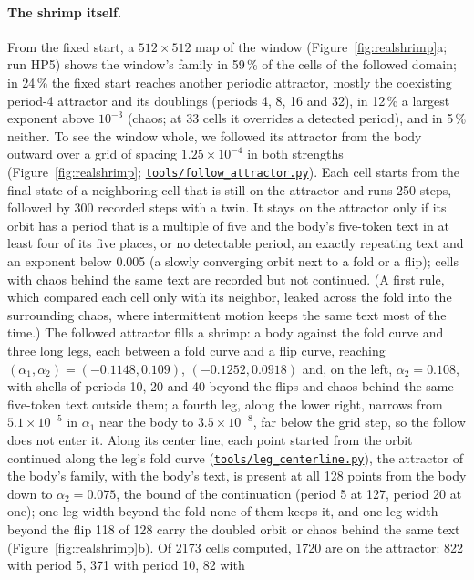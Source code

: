 \documentclass[11pt,letterpaper]{article}
\newcommand{\repourl}{https://github.com/tdj28/neural-shrimp}
\newcommand{\reporef}{arxiv-v1}
\newcommand{\repo}[1]{\href{\repourl/blob/\reporef/#1}{\nolinkurl{#1}}}
\begin{document}
\paragraph{The shrimp itself.} From the fixed start, a $512\times512$ map of the window (Figure~\ref{fig:realshrimp}a;
run HP5) shows the window's family in 59\,\% of the cells of the followed domain; in 24\,\% the fixed start reaches
another periodic attractor, mostly the coexisting period-4 attractor and its doublings (periods 4, 8, 16 and 32), in
12\,\% a largest exponent above $10^{-3}$ (chaos; at 33 cells it overrides a detected period), and in 5\,\% neither. To see the window whole, we followed its attractor from the body outward over a grid of
spacing $1.25\times10^{-4}$ in both strengths (Figure~\ref{fig:realshrimp}; \repo{tools/follow_attractor.py}). Each
cell starts from the final state of a neighboring cell that is still on the attractor and runs 250 steps, followed by
300 recorded steps with a twin. It stays on the attractor only if its orbit has a period that is a multiple of five and
the body's five-token text in at least four of its five places, or no detectable period, an exactly repeating text and
an exponent below 0.005 (a slowly converging orbit next to a fold or a flip); cells with chaos behind the same text are
recorded but not continued. (A first rule, which compared each cell only with its neighbor, leaked across the fold
into the surrounding chaos, where intermittent motion keeps the same text most of the time.) The followed attractor
fills a shrimp: a body against the fold curve and three long legs, each between a fold curve and a flip curve, reaching
$(\alpha_1,\alpha_2)=(-0.1148,0.109)$, $(-0.1252,0.0918)$ and, on the left, $\alpha_2=0.108$, with shells of periods
10, 20 and 40 beyond the flips and chaos behind the same five-token text outside them; a fourth leg, along the lower right, narrows from $5.1\times10^{-5}$ in $\alpha_1$ near the body to
$3.5\times10^{-8}$, far below the grid step, so the follow does not enter it. Along its center line, each point
started from the orbit continued along the leg's fold curve (\repo{tools/leg_centerline.py}), the attractor of
the body's family, with the body's text, is present at all 128 points from the body down to $\alpha_2=0.075$, the
bound of the continuation (period 5 at 127, period 20 at one); one leg width beyond the fold none of them keeps it,
and one leg width beyond the flip 118 of 128 carry the doubled orbit or chaos behind the same text
(Figure~\ref{fig:realshrimp}b). Of 2173 cells computed, 1720 are on the attractor: 822 with period 5, 371 with period 10, 82 with
\end{document}
